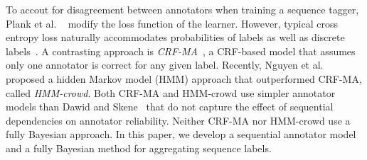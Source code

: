 To accout for disagreement between annotators when training a sequence tagger, Plank et al. ~ 
modify the loss function of the learner.
However, typical cross entropy loss
naturally accommodates probabilities of labels as well as discrete labels~\cite{bekker2016training}.
A contrasting approach is \emph{CRF-MA}~\cite{rodrigues2014sequence},
a CRF-based model that assumes only one annotator is correct for any given label.
Recently, Nguyen et al.~ proposed a hidden Markov model (HMM) approach that outperformed CRF-MA, called \emph{HMM-crowd}.
Both CRF-MA and HMM-crowd use simpler annotator models than Dawid and Skene~
that do not capture the effect of sequential dependencies on annotator reliability.
Neither CRF-MA nor HMM-crowd use a fully Bayesian approach.
In this paper, we develop a sequential annotator model and a fully Bayesian method for aggregating sequence labels.  %

